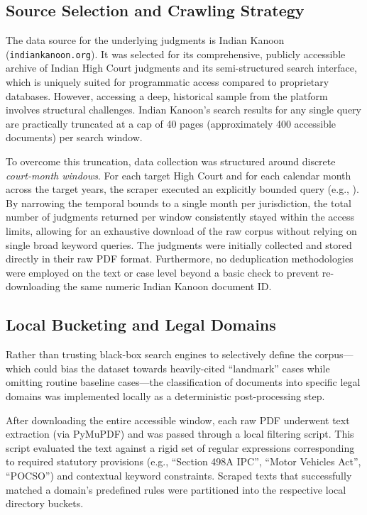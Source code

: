 {
\subsection{Source Selection and Crawling Strategy}

\begin{sloppypar}
The data source for the underlying judgments is Indian Kanoon (\texttt{indiankanoon.org}). It was selected for its comprehensive, publicly accessible archive of Indian High Court judgments and its semi-structured search interface, which is uniquely suited for programmatic access compared to proprietary databases. However, accessing a deep, historical sample from the platform involves structural challenges. Indian Kanoon's search results for any single query are practically truncated at a cap of 40 pages (approximately 400 accessible documents) per search window. 
\end{sloppypar}

\begin{sloppypar}
To overcome this truncation, data collection was structured around discrete \emph{court-month windows}. For each target High Court and for each calendar month across the target years, the scraper executed an explicitly bounded query (e.g., ). By narrowing the temporal bounds to a single month per jurisdiction, the total number of judgments returned per window consistently stayed within the access limits, allowing for an exhaustive download of the raw corpus without relying on single broad keyword queries. The judgments were initially collected and stored directly in their raw PDF format. Furthermore, no deduplication methodologies were employed on the text or case level beyond a basic check to prevent re-downloading the same numeric Indian Kanoon document ID.
\end{sloppypar}

\subsection{Local Bucketing and Legal Domains}

Rather than trusting black-box search engines to selectively define the corpus---which could bias the dataset towards heavily-cited ``landmark'' cases while omitting routine baseline cases---the classification of documents into specific legal domains was implemented locally as a deterministic post-processing step.

After downloading the entire accessible window, each raw PDF underwent text extraction (via PyMuPDF) and was passed through a local filtering script. This script evaluated the text against a rigid set of regular expressions corresponding to required statutory provisions (e.g., ``Section 498A IPC'', ``Motor Vehicles Act'', ``POCSO'') and contextual keyword constraints. Scraped texts that successfully matched a domain's predefined rules were partitioned into the respective local directory buckets.

}
